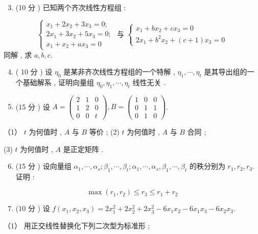 \documentclass[10pt]{article}
\begin{document}
{\begin{enumerate}
  \setcounter{enumi}{2}
  \item (10  分 )  已知两个齐次线性方程组 :
\end{enumerate}
$$
\left\{\begin{array} { l } 
{ x _ { 1 } + 2 x _ { 2 } + 3 x _ { 3 } = 0 ; } \\
{ 2 x _ { 1 } + 3 x _ { 2 } + 5 x _ { 3 } = 0 ; } \\
{ x _ { 1 } + x _ { 2 } + a x _ { 3 } = 0 }
\end{array} \text { 与 } \left\{\begin{array}{l}
x_{1}+b x_{2}+c x_{3}=0 \\
2 x_{1}+b^{2} x_{2}+(c+1) x_{3}=0
\end{array}\right.\right.
$$
 同解 ,  求  $a, b, c$.

\begin{enumerate}
  \setcounter{enumi}{3}
  \item ( 10  分 )  设  $\eta_{0}$  是某非齐次线性方程组的一个特解 , $\eta_{1}, \cdots, \eta_{t}$  是其导出组的一个基础解系 ,  证明向量组  $\eta_{0}, \eta_{1}, \cdots, \eta_{t}$  线性无关 .

  \item (15  分 )  设  $A=\left(\begin{array}{lll}2 & 1 & 0 \\ 1 & 2 & 0 \\ 0 & 0 & t\end{array}\right), B=\left(\begin{array}{lll}1 & 0 & 0 \\ 0 & 1 & 1 \\ 0 & 1 & 0\end{array}\right)$.

\end{enumerate}
（1） $t$  为何值时 , $A$  与  $B$  等价 ; (2) $t$  为何值时 , $A$  与  $B$  合同 ;

(3) $t$  为何值时 , $A$  是正定矩阵 .

\begin{enumerate}
  \setcounter{enumi}{5}
  \item (15  分 )  设向量组  $\alpha_{1}, \cdots, \alpha_{s} ; \beta_{1}, \cdots, \beta_{t} ; \alpha_{1}, \cdots, \alpha_{s}, \beta_{1}, \cdots, \beta_{t}$  的秩分别为  $r_{1}, r_{2}, r_{3}$.  证明 :
\end{enumerate}
$$
\max \left(r_{1}, r_{2}\right) \leqslant r_{3} \leqslant r_{1}+r_{2}
$$

\begin{enumerate}
  \setcounter{enumi}{6}
  \item (10  分 )  设  $f\left(x_{1}, x_{2}, x_{3}\right)=2 x_{1}^{2}+2 x_{2}^{2}+2 x_{3}^{2}-6 x_{1} x_{2}-6 x_{1} x_{3}-6 x_{2} x_{3}$.
\end{enumerate}
（1） 用正交线性替换化下列二次型为标准形 ;

}
\end{document}
